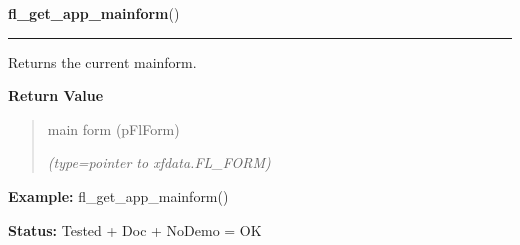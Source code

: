 \hspace{.8\funcindent}\begin{boxedminipage}{\funcwidth}

    \raggedright \textbf{fl\_get\_app\_mainform}()

    \vspace{-1.5ex}

    \rule{\textwidth}{0.5\fboxrule}
\setlength{\parskip}{2ex}
    Returns the current mainform.

\setlength{\parskip}{1ex}
      \textbf{Return Value}
    \vspace{-1ex}

      \begin{quote}
      main form (pFlForm)

      {\it (type=pointer to xfdata.FL\_FORM)}

      \end{quote}

\textbf{Example:} fl\_get\_app\_mainform()



\textbf{Status:} Tested + Doc + NoDemo = OK



    \end{boxedminipage}

    \label{xformslib:flbasic:fl_set_app_nomainform}

    \vspace{0.5ex}

